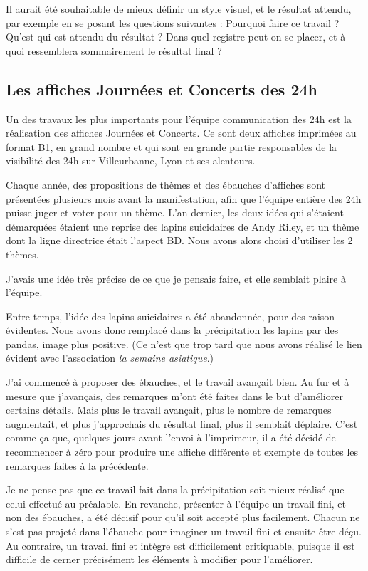         Il aurait été souhaitable de mieux définir un style visuel, et le résultat attendu, par exemple en se posant les questions suivantes :
        Pourquoi faire ce travail ? Qu'est qui est attendu du résultat ? Dans quel registre peut-on se placer, et à quoi ressemblera sommairement le résultat final ?
        
    \subsection{Les affiches Journées et Concerts des 24h}
        
        Un des travaux les plus importants pour l'équipe communication des 24h est la réalisation des affiches Journées et Concerts.
        Ce sont deux affiches imprimées au format B1, en grand nombre et qui sont en grande partie responsables de la visibilité des 24h sur Villeurbanne, Lyon et ses alentours.
        
        Chaque année, des propositions de thèmes et des ébauches d'affiches sont présentées plusieurs mois avant la manifestation, afin que l'équipe entière des 24h puisse juger et voter pour un thème.
        L'an dernier, les deux idées qui s'étaient démarquées étaient une reprise des lapins suicidaires de Andy Riley, et un thème dont la ligne directrice était l'aspect BD.
        Nous avons alors choisi d'utiliser les 2 thèmes.

        J'avais une idée très précise de ce que je pensais faire, et elle semblait plaire à l'équipe.
        
        Entre-temps, l'idée des lapins suicidaires a été abandonnée, pour des raison évidentes.
        Nous avons donc remplacé dans la précipitation les lapins par des pandas, image plus positive. (Ce n'est que trop tard que nous avons réalisé le lien évident avec l'association \emph{la semaine asiatique}.)
        
        J'ai commencé à proposer des ébauches, et le travail avançait bien.
        Au fur et à mesure que j'avançais, des remarques m'ont été faites dans le but d'améliorer certains détails.
        Mais plus le travail avançait, plus le nombre de remarques augmentait, et plus j'approchais du résultat final, plus il semblait déplaire.
        C'est comme ça que, quelques jours avant l'envoi à l'imprimeur, il a été décidé de recommencer à zéro pour produire une affiche différente et exempte de toutes les remarques faites à la précédente.
        
        Je ne pense pas que ce travail fait dans la précipitation soit mieux réalisé que celui effectué au préalable.
        En revanche, présenter à l'équipe un travail fini, et non des ébauches, a été décisif pour qu'il soit  accepté plus facilement.
        Chacun ne s'est pas projeté dans l'ébauche pour imaginer un travail fini et ensuite être déçu.
        Au contraire, un travail fini et intègre est difficilement critiquable, puisque il est difficile de cerner précisément les éléments à modifier pour l'améliorer.
        
